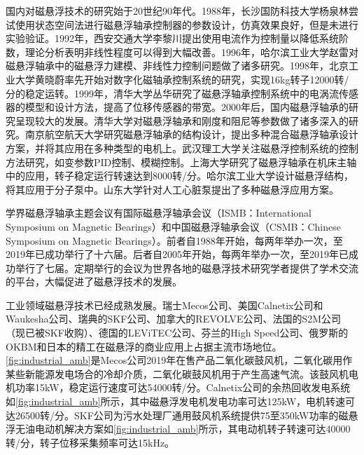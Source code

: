 国内对磁悬浮技术的研究始于20世纪90年代。1988年，长沙国防科技大学杨泉林尝试使用状态空间法进行磁悬浮轴承控制器的参数设计\cite{杨泉林1988状态反馈去耦原理在磁悬浮轴承设计中的应用}，仿真效果良好，但是未进行实验验证。1992年，西安交通大学李黎川提出使用电流作为控制量以降低系统阶数，理论分析表明非线性程度可以得到大幅改善\cite{李黎川1992磁悬浮轴承物理模型的降阶及非线性改善}。1996年，哈尔滨工业大学赵雷对磁悬浮轴承中的磁悬浮力建模、非线性力控制问题做了诸多研究\cite{赵雷1996可控磁悬浮轴承刚度的提高与大范围稳定性,赵雷1996径向磁悬浮轴承结构特性研究及其模型的建立}。1998年，北京工业大学黄晓蔚率先开始对数字化磁轴承控制系统的研究，实现16kg转子12000转/分的稳定运转\cite{黄晓蔚1998数字控制的有源磁悬浮轴承的实验研究}。1999年，清华大学丛华研究了磁悬浮轴承控制系统中的电涡流传感器的模型和设计方法，提高了位移传感器的带宽\cite{丛华1999电涡流传感器动态响应特性研究}。2000年后，国内磁悬浮轴承的研究呈现较大的发展。清华大学对磁悬浮轴承和刚度和阻尼等参数做了诸多深入的研究\cite{赵雷1999可控磁悬浮轴承刚度与阻尼特性研究}。南京航空航天大学研究磁悬浮轴承的结构设计，提出多种混合磁悬浮轴承设计方案，并将其应用在多种类型的电机上\cite{朱熀秋2002永磁偏置径向,曾励1999永磁偏置的混合磁悬浮轴承的研究}。武汉理工大学关注磁悬浮控制系统的控制方法研究，如变参数PID控制、模糊控制\cite{苏义鑫2004磁悬浮轴承的变参数,刘晓军2006人工心脏泵磁悬浮转子非线性特性及控制方法研究}。上海大学研究了磁悬浮轴承在机床主轴中的应用，转子稳定运行转速达到8000转/分\cite{张钢2005磁悬浮支承技术在机床中的应用}。哈尔滨工业大学设计磁悬浮结构，将其应用于分子泵中\cite{周红海2006分子泵磁悬浮轴承结构及功率放大器设计}。山东大学针对人工心脏泵提出了多种磁悬浮应用方案\cite{关勇2010轴流式磁悬浮人工心脏泵磁悬浮轴承系统设计,杨晟2010轴流式磁悬浮人工心脏泵驱动电机的研究}。

学界磁悬浮轴承主题会议有国际磁悬浮轴承会议（ISMB：International Symposium on Magnetic Bearings）和中国磁悬浮轴承会议（CSMB：Chinese Symposium on Magnetic Bearings）。前者自1988年开始，每两年举办一次，至2019年已成功举行了十六届。后者自2005年开始，每两年举办一次，至2019年已成功举行了七届。定期举行的会议为世界各地的磁悬浮技术研究学者提供了学术交流的平台，大幅促进了磁悬浮技术的发展。

工业领域磁悬浮技术已经成熟发展。瑞士Mecos公司、美国Calnetix公司和Waukesha公司、瑞典的SKF公司、加拿大的REVOLVE公司、法国的S2M公司（现已被SKF收购）、德国的LEViTEC公司、芬兰的High Speed公司、俄罗斯的OKBM和日本的精工在磁悬浮的商业应用上占据主流市场地位。\autoref{fig:industrial_amb}是Mecos公司2019年在售产品二氧化碳鼓风机，二氧化碳用作某些新能源发电场合的冷却介质，二氧化碳鼓风机用于产生高速气流。该鼓风机电机功率15kW，稳定运行速度可达54000转/分。Calnetix公司的余热回收发电系统如\autoref{fig:industrial_amb}所示，其中磁悬浮发电机发电功率可达125kW，电机转速可达26500转/分。SKF公司为污水处理厂通用鼓风机系统提供75至350kW功率的磁悬浮无油电动机解决方案如\autoref{fig:industrial_amb}所示，其电动机转子转速可达40000转/分，转子位移采集频率可达15kHz。


